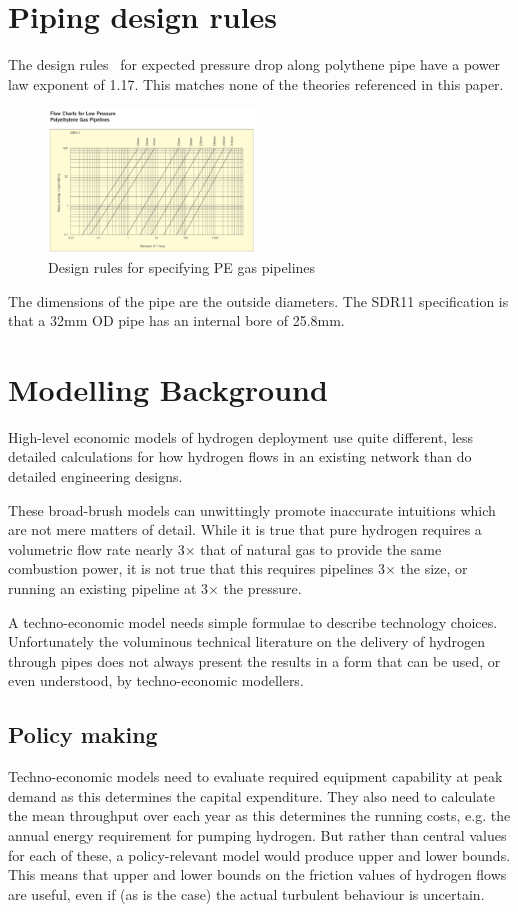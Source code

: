 \documentclass[5p]{elsarticle} %
\begin{document}
\section{Piping design rules}
\label{sec:pipe-rules}

The design rules~\citep{GPS2008} for expected pressure drop along polythene pipe have a power law exponent of 1.17. This matches none of the theories referenced in this paper.
\begin{figure}[ht]
\centering
\includegraphics[width=0.49\textwidth]{sdr11-design-rules.png}
\caption{Design rules for specifying PE gas pipelines}
\label{fig:pipe-rules}
\end{figure}

The dimensions of the pipe are the outside diameters. The SDR11 specification is that a 32mm OD pipe has an internal bore of 25.8mm.


\section{Modelling Background} 
High-level economic models of hydrogen deployment use quite different, less detailed calculations for how hydrogen flows in an existing network than do detailed engineering designs.

These broad-brush models can unwittingly promote inaccurate intuitions which are not mere matters of detail. While it is true that pure hydrogen requires a volumetric flow rate nearly 3$\times$  that of natural gas to provide the same combustion power, it is not true that this requires pipelines 3$\times$  the size, or running an existing pipeline at 3$\times$  the pressure.

A techno-economic model needs simple formulae to describe technology choices. Unfortunately the voluminous technical literature on the delivery of hydrogen through pipes does not always present the results in a form that can be used, or even understood, by techno-economic modellers. 

\subsection{Policy making}
Techno-economic models need to evaluate required equipment capability at peak demand as this determines the capital expenditure. They also need to calculate the mean throughput over each year as this determines the running costs, e.g. the annual energy requirement for pumping hydrogen. But rather than central values for each of these, a policy-relevant model would produce upper and lower bounds. This means that upper and lower bounds on the friction values of hydrogen flows are useful, even if (as is the case) the actual turbulent behaviour is uncertain.
\end{document}
